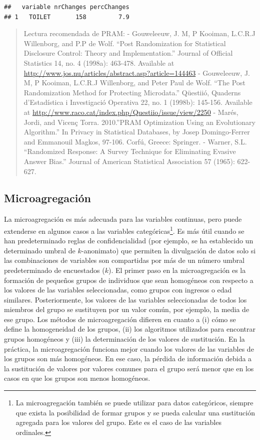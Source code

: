 \documentclass[]{book}
\theoremstyle{definition}
\theoremstyle{definition}
\theoremstyle{definition}
\theoremstyle{definition}
\theoremstyle{remark}
\begin{document}
\begin{verbatim}
##   variable nrChanges percChanges
## 1   TOILET       158         7.9
\end{verbatim}

\begin{quote}
Lectura recomendada de PRAM:
- Gouweleeuw, J. M, P Kooiman, L.C.R.J Willenborg, and P.P de Wolf. ``Post Randomization for Statistical Disclosure Control: Theory and Implementation.'' Journal of Official Statistics 14, no. 4 (1998a): 463-478. Available at \url{http://www.jos.nu/articles/abstract.asp?article=144463}
- Gouweleeuw, J. M, P Kooiman, L.C.R.J Willenborg, and Peter Paul de Wolf. ``The Post Randomization Method for Protecting Microdata.'' Qüestiió, Quaderns d'Estadística i Investigació Operativa 22, no. 1 (1998b): 145-156. Available at \url{http://www.raco.cat/index.php/Questiio/issue/view/2250}
- Marés, Jordi, and Vicenç Torra. 2010.''PRAM Optimization Using an Evolutionary Algorithm.'' In Privacy in Statistical Databases, by Josep Domingo-Ferrer and Emmanouil Magkos, 97-106. Corfú, Greece: Springer.
- Warner, S.L. ``Randomized Response: A Survey Technique for Eliminating Evasive Answer Bias.'' Journal of American Statistical Association 57 (1965): 622-627.
\end{quote}

\hypertarget{microagregaciuxf3n}{%
\subsection{Microagregación}\label{microagregaciuxf3n}}

La microagregación es más adecuada para las variables continuas, pero puede extenderse en algunos casos a las variables categóricas\footnote{La microagregación también se puede utilizar para datos categóricos, siempre que exista la posibilidad de formar grupos y se pueda calcular una sustitución agregada para los valores del grupo. Este es el caso de las variables ordinales.}. Es más útil cuando se han predeterminado reglas de confidencialidad (por ejemplo, se ha establecido un determinado umbral de \(k\)-anonimato) que permiten la divulgación de datos solo si las combinaciones de variables son compartidas por más de un número umbral predeterminado de encuestados (\(k\)). El primer paso en la microagregación es la formación de pequeños grupos de individuos que sean homogéneos con respecto a los valores de las variables seleccionadas, como grupos con ingresos o edad similares. Posteriormente, los valores de las variables seleccionadas de todos los miembros del grupo se sustituyen por un valor común, por ejemplo, la media de ese grupo. Los métodos de microagregación difieren en cuanto a (i) cómo se define la homogeneidad de los grupos, (ii) los algoritmos utilizados para encontrar grupos homogéneos y (iii) la determinación de los valores de sustitución. En la práctica, la microagregación funciona mejor cuando los valores de las variables de los grupos son más homogéneos. En ese caso, la pérdida de información debida a la sustitución de valores por valores comunes para el grupo será menor que en los casos en que los grupos son menos homogéneos.
\end{document}
